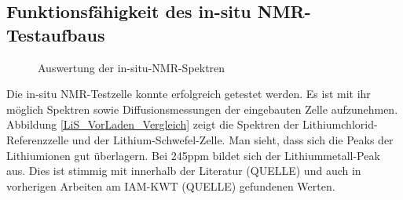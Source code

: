 \documentclass[a4paper, 11pt, headsepline,footsepline,twoside,abstract]{scrbook}
\begin{document}
\subsection{Funktionsfähigkeit des in-situ NMR-Testaufbaus}
\begin{figure}
   \centering
       \vspace{10mm}
       \vspace{6mm}
	\caption{Auswertung der in-situ-NMR-Spektren}
   	\label{insitu_nmr_auswertung}
\end{figure} 
Die in-situ NMR-Testzelle konnte erfolgreich getestet werden. Es ist mit ihr möglich Spektren sowie Diffusionsmessungen der eingebauten Zelle aufzunehmen. Abbildung \ref{LiS_VorLaden_Vergleich} zeigt die Spektren der Lithiumchlorid-Referenzzelle und der Lithium-Schwefel-Zelle. Man sieht, dass sich die Peaks der Lithiumionen gut überlagern. Bei 245\;ppm bildet sich der Lithiummetall-Peak aus. Dies ist stimmig mit innerhalb der Literatur (QUELLE) und auch in vorherigen Arbeiten am IAM-KWT (QUELLE) gefundenen Werten.
\end{document}
